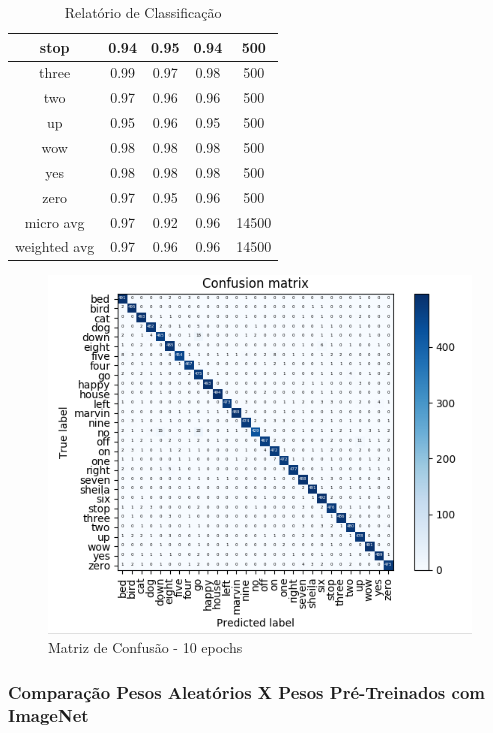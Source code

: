 \documentclass{bmvc2k}
\begin{document}
\begin{table}[htbp]
\begin{tabular}{|c|c|c|c|c|}
        stop &      0.94  &    0.95  &    0.94 &      500 \\ \hline
       three &      0.99  &    0.97  &    0.98 &      500 \\ \hline
         two &      0.97  &    0.96  &    0.96 &      500 \\ \hline
          up &      0.95  &    0.96  &    0.95 &      500 \\ \hline
         wow &      0.98  &    0.98  &    0.98 &      500 \\ \hline
         yes &      0.98  &    0.98  &    0.98 &      500 \\ \hline
        zero &      0.97  &    0.95  &    0.96 &      500 \\ \hline

   micro avg &      0.97   &   0.92  &    0.96 &    14500 \\ 
weighted avg &      0.97   &   0.96  &    0.96 &    14500 \\ \hline
\end{tabular}
\caption{Relatório de Classificação}
\end{table}

\begin{figure}[ht]
\centering
\includegraphics[scale=0.6]{imagens/mtxc.png} 
\caption{Matriz de Confusão - 10 epochs}
\end{figure}

\subsubsection*{Comparação Pesos Aleatórios X Pesos Pré-Treinados com ImageNet}
\end{document}
